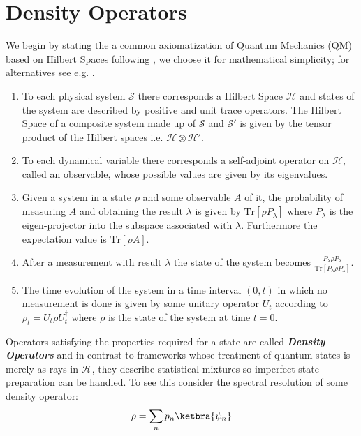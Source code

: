 \section{Density Operators}
We begin by stating the a common axiomatization of Quantum Mechanics (QM) based on Hilbert Spaces following \cite{ballentine2014quantum}, we choose it for mathematical simplicity; for alternatives see e.g. \cite{reyes2017some}.
\begin{enumerate}
        \item To each physical system $\mathcal{S}$ there corresponds a Hilbert Space $\mathcal{H}$ and states of the system are described by positive and unit trace operators. The Hilbert Space of a composite system made up of $\mathcal{S}$ and $\mathcal{S}'$
        is given by the tensor product of the Hilbert spaces i.e. $\mathcal{H}\otimes\mathcal{H}'$.
        \item To each dynamical variable there corresponds a self-adjoint operator on $\mathcal{H}$, called an observable, whose possible
        values are given by its eigenvalues.
        \item Given a system in a state $\rho$ and some observable $A$ of it, the probability of measuring $A$ and obtaining the result
        $\lambda$ is given by $\mathrm{Tr}[\rho P_{\lambda}]$ where $P_{\lambda}$ is the eigen-projector into the subspace associated with
        $\lambda$. Furthermore the expectation value is $\mathrm{Tr}[\rho A]$.
        \item After a measurement with result $\lambda$ the state of the system becomes $\frac{P_{\lambda}\rho P_{\lambda}}{\mathrm{Tr}[P_{\lambda}\rho
        P_{\lambda}]}$.
        \item The time evolution of the system in a time interval $(0,t)$ in which no measurement is done is given by some unitary operator
        $U_{t}$ according to $\rho_{t}=U_{t}\rho U_{t}^{\dagger}$ where $\rho$ is the state of the system at time $t=0$.
\end{enumerate}
Operators satisfying the properties required for a state are called \textit{\textbf{Density Operators}} and in contrast to frameworks
whose treatment of quantum states is merely as rays in $\mathcal{H}$, they describe statistical mixtures so imperfect state preparation
can be handled. To see this consider the spectral resolution of some density operator:
\begin{equation}
  \rho = \sum_{n}p_{n}\ketbra{\psi_{n}}
\end{equation}
